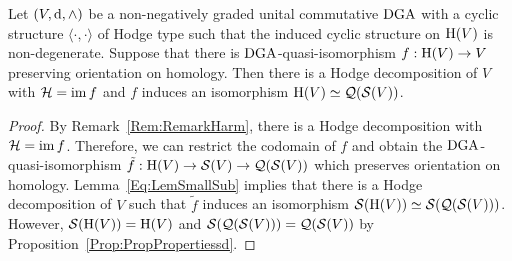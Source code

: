 \documentclass[\MainFolder/Text.tex]{subfiles}
\begin{document}
%
%
%
%
%
%
%
\begin{Proposition}\label{Prop:SmalGeomForm}
Let $(V,\mathrm{d},\wedge)$ be a non-negatively graded unital commutative $\mathrm{DGA}$ with a cyclic structure $\langle\cdot,\cdot\rangle$ of Hodge type such that the induced cyclic structure on $\mathrm{H}(V)$ is non-degenerate. Suppose that there is $\mathrm{DGA}$-quasi-isomorphism $f: \mathrm{H}(V) \rightarrow V$ preserving orientation on homology. Then there is a Hodge decomposition of $V$ with $\mathcal{H} = \operatorname{im} f$ and $f$ induces an isomorphism $\mathrm{H}(V) \simeq \mathcal{Q}(\mathcal{S}(V))$.
\end{Proposition}

\begin{proof}
By Remark~\ref{Rem:RemarkHarm}, there is a Hodge decomposition with $\mathcal{H} = \operatorname{im} f$. Therefore, we can restrict the codomain of $f$ and obtain the $\mathrm{DGA}$-quasi-isomorphism $\tilde{f}: \mathrm{H}(V) \rightarrow \mathcal{S}(V) \rightarrow \mathcal{Q}(\mathcal{S}(V))$ which preserves orientation on homology. Lemma~\ref{Eq:LemSmallSub} implies that there is a Hodge decomposition of $V$ such that $\tilde{f}$ induces an isomorphism $\mathcal{S}(\mathrm{H}(V))\simeq \mathcal{S}(\mathcal{Q}(\mathcal{S}(V)))$. However, $\mathcal{S}(\mathrm{H}(V))=\mathrm{H}(V)$ and $\mathcal{S}(\mathcal{Q}(\mathcal{S}(V)))=\mathcal{Q}(\mathcal{S}(V))$ by Proposition~\ref{Prop:PropPropertiessd}.
\end{proof}
\end{document}

